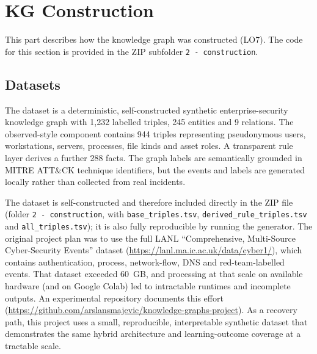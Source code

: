 \documentclass{article}
\begin{document}
\section{KG Construction}
This part describes how the knowledge graph was constructed (LO7). The code for
this section is provided in the ZIP subfolder \texttt{2 - construction}.

\subsection{Datasets}
The dataset is a deterministic, self-constructed synthetic enterprise-security
knowledge graph with 1{,}232 labelled triples, 245 entities and 9 relations.
The observed-style component contains 944 triples representing pseudonymous
users, workstations, servers, processes, file kinds and asset roles. A
transparent rule layer derives a further 288 facts. The graph labels are
semantically grounded in MITRE ATT\&CK technique identifiers, but the events and
labels are generated locally rather than collected from real incidents.

The dataset is self-constructed and therefore included directly in the ZIP file
(folder \texttt{2 - construction}, with \texttt{base\_triples.tsv},
\texttt{derived\_rule\_triples.tsv} and \texttt{all\_triples.tsv}); it is also
fully reproducible by running the generator. The original project plan was to
use the full LANL ``Comprehensive, Multi-Source Cyber-Security Events'' dataset
(\url{https://lanl.ma.ic.ac.uk/data/cyber1/}), which contains authentication,
process, network-flow, DNS and red-team-labelled events. That dataset exceeded
60~GB, and processing at that scale on available hardware (and on Google Colab)
led to intractable runtimes and incomplete outputs. An experimental repository
documents this effort
(\url{https://github.com/arslansmajevic/knowledge-graphs-project}). As a
recovery path, this project uses a small, reproducible, interpretable synthetic
dataset that demonstrates the same hybrid architecture and learning-outcome
coverage at a tractable scale.
\end{document}
